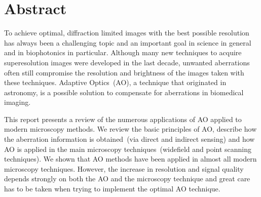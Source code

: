 \section*{Abstract}

To achieve optimal, diffraction limited images with the best possible resolution has always been a challenging topic and an important goal in science in general and in biophotonics in particular. Although many new techniques to acquire superesolution images were developed in the last decade, unwanted aberrations often still compromise the resolution and brightness of the images taken with these techniques. Adaptive Optics~(AO), a technique that originated in astronomy, is a possible solution to compensate for aberrations in biomedical imaging. 

This report presents a review of the numerous applications of AO applied to modern microscopy methods. We review the basic principles of AO, describe how the aberration information is obtained~(via direct and indirect sensing) and how AO is applied in the main microscopy techniques~(widefield and point scanning techniques). We shown that AO methods have been applied in almost all modern microscopy techniques. However, the increase in resolution and signal quality depends strongly on both the AO and the microscopy technique and great care has to be taken when trying to implement the optimal AO technique.